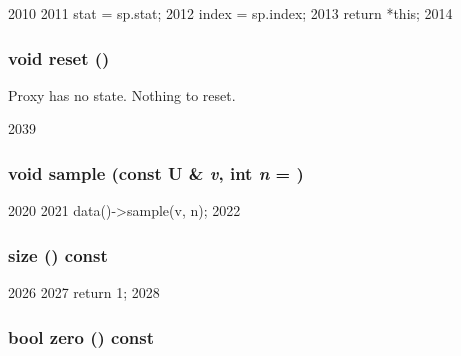 \begin{DoxyCode}
2010     {
2011         stat = sp.stat;
2012         index = sp.index;
2013         return *this;
2014     }
\end{DoxyCode}
\hypertarget{classStats_1_1DistProxy_ad20897c5c8bd47f5d4005989bead0e55}{
\subsubsection[{reset}]{\setlength{\rightskip}{0pt plus 5cm}void reset ()}}
\label{classStats_1_1DistProxy_ad20897c5c8bd47f5d4005989bead0e55}
Proxy has no state. Nothing to reset. 


\begin{DoxyCode}
2039 { }
\end{DoxyCode}
\hypertarget{classStats_1_1DistProxy_afed4e1e09f566c5aa9e972d8c17b5a27}{
\subsubsection[{sample}]{\setlength{\rightskip}{0pt plus 5cm}void sample (const U \& {\em v}, \/  int {\em n} = {})}}
\label{classStats_1_1DistProxy_afed4e1e09f566c5aa9e972d8c17b5a27}



\begin{DoxyCode}
2020     {
2021         data()->sample(v, n);
2022     }
\end{DoxyCode}
\hypertarget{classStats_1_1DistProxy_a503ab01f6c0142145d3434f6924714e7}{
\subsubsection[{size}]{ size () const}}
\label{classStats_1_1DistProxy_a503ab01f6c0142145d3434f6924714e7}



\begin{DoxyCode}
2026     {
2027         return 1;
2028     }
\end{DoxyCode}
\hypertarget{classStats_1_1DistProxy_a4e72b01b727d3165e75cba84eb507491}{
\subsubsection[{zero}]{\setlength{\rightskip}{0pt plus 5cm}bool zero () const}}
\label{classStats_1_1DistProxy_a4e72b01b727d3165e75cba84eb507491}



